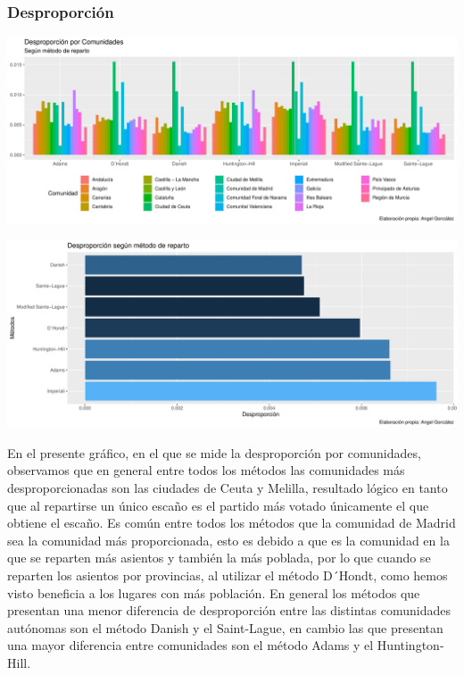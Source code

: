 \documentclass[12pt,a4paper,]{book}
\numberwithin{dummy}{section}
\theoremstyle{ocrenumbox}
\theoremstyle{blacknumex}
\theoremstyle{blacknumbox}
\theoremstyle{ocrenum}
\theoremstyle{ocrenum}
\begin{document}
\hypertarget{desproporciuxf3n}{%
\subsubsection{Desproporción}\label{desproporciuxf3n}}

\begin{center}\includegraphics[width=0.95\linewidth]{figurasR/unnamed-chunk-60-1} \end{center}

\begin{center}\includegraphics[width=0.95\linewidth]{figurasR/unnamed-chunk-60-2} \end{center}

En el presente gráfico, en el que se mide la desproporción por
comunidades, observamos que en general entre todos los métodos las
comunidades más desproporcionadas son las ciudades de Ceuta y Melilla,
resultado lógico en tanto que al repartirse un único escaño es el
partido más votado únicamente el que obtiene el escaño. Es común entre
todos los métodos que la comunidad de Madrid sea la comunidad más
proporcionada, esto es debido a que es la comunidad en la que se
reparten más asientos y también la más poblada, por lo que cuando se
reparten los asientos por provincias, al utilizar el método D´Hondt,
como hemos visto beneficia a los lugares con más población. En general
los métodos que presentan una menor diferencia de desproporción entre
las distintas comunidades autónomas son el método Danish y el
Saint-Lague, en cambio las que presentan una mayor diferencia entre
comunidades son el método Adams y el Huntington-Hill.
\end{document}
